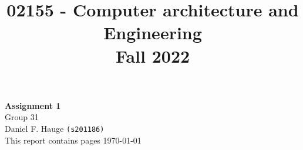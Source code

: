 \documentclass[a4paper]{article}
\begin{document}
\title{02155 - Computer architecture and Engineering\\Fall 2022}
\author{
}
\date{} %
\color{black}
\maketitle

\begin{center}
    { \huge \bfseries Assignment 1}\\
    
    \vspace{1.25cm}
    Group 31\\
    \vspace{.25cm}
    Daniel F. Hauge \texttt{(s201186)}\\
    
    \vspace{6cm}
    This report contains \pageref{LastPage} pages
    \vspace{.25cm}
    \vfill
    \today
\end{center}


\medskip
\newpage


\end{document}
